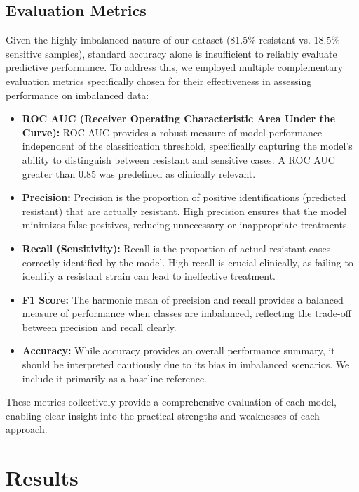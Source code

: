 \documentclass{article}
\begin{document}
\subsection{Evaluation Metrics}

Given the highly imbalanced nature of our dataset (81.5\% resistant vs. 18.5\% sensitive samples), standard accuracy alone is insufficient to reliably evaluate predictive performance. To address this, we employed multiple complementary evaluation metrics specifically chosen for their effectiveness in assessing performance on imbalanced data:

\begin{itemize}
    \item \textbf{ROC AUC (Receiver Operating Characteristic Area Under the Curve):} 
    ROC AUC provides a robust measure of model performance independent of the classification threshold, specifically capturing the model's ability to distinguish between resistant and sensitive cases. A ROC AUC greater than 0.85 was predefined as clinically relevant.

    \item \textbf{Precision:} Precision is the proportion of positive identifications (predicted resistant) that are actually resistant. High precision ensures that the model minimizes false positives, reducing unnecessary or inappropriate treatments.

    \item \textbf{Recall (Sensitivity):} Recall is the proportion of actual resistant cases correctly identified by the model. High recall is crucial clinically, as failing to identify a resistant strain can lead to ineffective treatment.

    \item \textbf{F1 Score:} The harmonic mean of precision and recall provides a balanced measure of performance when classes are imbalanced, reflecting the trade-off between precision and recall clearly.

    \item \textbf{Accuracy:} While accuracy provides an overall performance summary, it should be interpreted cautiously due to its bias in imbalanced scenarios. We include it primarily as a baseline reference.
\end{itemize}

These metrics collectively provide a comprehensive evaluation of each model, enabling clear insight into the practical strengths and weaknesses of each approach.

\section{Results}
\end{document}
